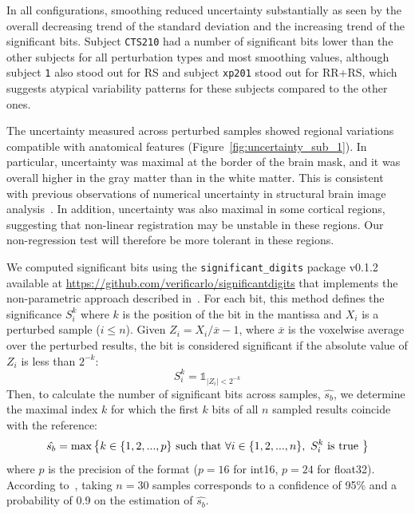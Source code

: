 \documentclass{article}
\begin{document}
In all configurations, smoothing reduced uncertainty
substantially as seen by the overall decreasing trend of the standard deviation and the
increasing trend of the significant bits. Subject \texttt{CTS210}
had a number of significant bits lower than the other subjects for all
perturbation types and most smoothing values, although subject \texttt{1} also
stood out for RS and subject \texttt{xp201} stood out for RR+RS, which suggests
atypical variability patterns for these subjects compared to the other ones.

The uncertainty measured across perturbed samples showed regional variations
compatible with anatomical features (Figure~\ref{fig:uncertainty_sub_1}). In
particular, uncertainty was maximal at the border of the brain mask, and it was
overall higher in the gray matter than in the white matter. This is consistent
with previous observations of numerical uncertainty in structural brain image
analysis~\cite{salari2021accurate}. In addition, uncertainty was also maximal in
some cortical regions, suggesting that non-linear registration may be unstable
in these regions. Our non-regression test will therefore be more tolerant in
these regions.

We computed significant bits using the \texttt{significant\_digits} package
v0.1.2 available at \url{https://github.com/verificarlo/significantdigits} that
implements the non-parametric approach described in~\cite{sohier2021confidence}.
For each bit, this method defines the significance $S^k_i$ where \(k\) is the
position of the bit in the mantissa and $X_i$ is a perturbed sample  ($i \leq
    n$). Given $Z_i=X_i/\overline{x}-1$, where $\overline{x}$ is the voxelwise average
over the perturbed results, the bit is considered significant if the absolute value of $Z_i$ is less
than $2^{-k}$:
\[S^k_i = \mathds{1}_{|Z_i |<2^{-k}}\] Then, to calculate the number of
significant bits across samples, $\hat{s_b}$, we determine the maximal index
\(k\) for which the first \(k\) bits of all \(n\) sampled results coincide with
the reference:
\[\hat{s_{b}} = \textnormal{max} \left\{ k \in \{1,2,...,p\} \textnormal{ such
        that } \forall i \in \{1,2,...,n\},\  S^{k}_{i} \textnormal{ is true } \right\} \]
where $p$ is the precision of the format ($p=16$ for int16, $p=24$ for float32).
According to~\cite{sohier2021confidence}, taking $n=30$ samples
corresponds to a confidence of 95\% and a probability of 0.9 on the estimation of $\hat{s_b}$.
\end{document}
